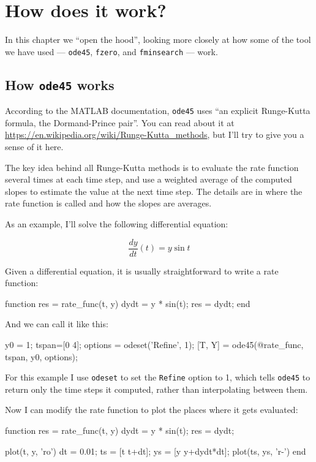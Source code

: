 \documentclass[
]{book}
\numberwithin{Answer}{chapter}
\numberwithin{Exercise}{chapter}
\begin{document}
\chapter{How does it work?}

In this chapter we ``open the hood'', looking more closely at how some of the tool we have used --- {\tt ode45}, {\tt fzero}, and {\tt fminsearch} --- work.


\section{How {\tt ode45} works}
\label{sect:howode45}

According to the MATLAB documentation, {\tt ode45} uses ``an explicit Runge-Kutta formula, the Dormand-Prince pair''.  You can read about it at \url{https://en.wikipedia.org/wiki/Runge-Kutta_methods}, but I'll try to give you a sense of it here.

The key idea behind all Runge-Kutta methods is to evaluate the rate function several times at each time step, and use a weighted average of the computed slopes to estimate the value at the next time step.  The details are in where the rate function is called and how the slopes are averages.

As an example, I'll solve the following differential equation:

\[ \frac{dy}{dt}(t) = y \sin t \] 

Given a differential equation, it is usually straightforward to write a rate function:

\begin{code}
function res = rate_func(t, y)
    dydt = y * sin(t);
    res = dydt;
end
\end{code}

And we can call it like this:

\begin{code}
    y0 = 1;
    tspan=[0 4];
    options = odeset('Refine', 1);
    [T, Y] = ode45(@rate_func, tspan, y0, options);
\end{code}

For this example I use {\tt odeset} to set the {\tt Refine} option to 1, which tells {\tt ode45} to return only the time steps it computed, rather than interpolating between them.

Now I can modify the rate function to plot the places where it gets evaluated:

\begin{code}
function res = rate_func(t, y)
    dydt = y * sin(t);
    res = dydt;

    plot(t, y, 'ro')
    dt = 0.01;
    ts = [t t+dt];
    ys = [y y+dydt*dt];
    plot(ts, ys, 'r-')
end
\end{code}
\end{document}
